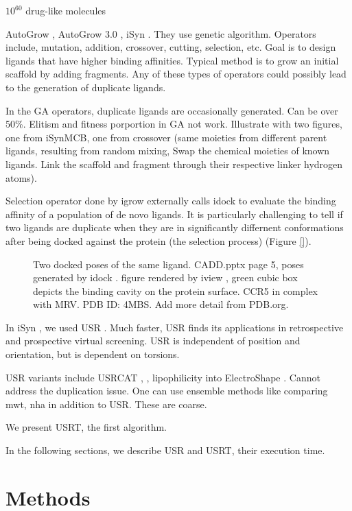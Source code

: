 \documentclass[twocolumn]{svjour3}          %
\begin{document}
$10^{60}$ drug-like molecules \cite{} %

AutoGrow \cite{466}, AutoGrow 3.0 \cite{1354}, iSyn \cite{}. They use genetic algorithm. Operators include, mutation, addition, crossover, cutting, selection, etc. Goal is to design ligands that have higher binding affinities. Typical method is to grow an initial scaffold by adding fragments. Any of these types of operators could possibly lead to the generation of duplicate ligands.

In the GA operators, duplicate ligands are occasionally generated. Can be over 50\%. Elitism and fitness porportion in GA not work. Illustrate with two figures, one from iSynMCB, one from crossover (same moieties from different parent ligands, resulting from random mixing, Swap the chemical moieties of known ligands. Link the scaffold and fragment through their respective linker hydrogen atoms).

Selection operator done by igrow externally calls idock to evaluate the binding affinity of a population of de novo ligands. It is particularly challenging to tell if two ligands are duplicate when they are in significantly differnent conformations after being docked against the protein (the selection process) (Figure \ref{}).

\begin{figure*}
\caption{Two docked poses of the same ligand. CADD.pptx page 5, poses generated by idock \cite{1153}. figure rendered by iview \cite{1366}, green cubic box depicts the binding cavity on the protein surface. CCR5 in complex with MRV. PDB ID: 4MBS. Add more detail from PDB.org.}
\label{fig:2}
\end{figure*}

In iSyn \cite{}, we used USR \cite{1379}. Much faster, USR finds its applications in retrospective \cite{1332} and prospective \cite{} virtual screening. USR is independent of position and orientation, but is dependent on torsions. %

USR variants include USRCAT \cite{1331}, \cite{1335}, lipophilicity into ElectroShape \cite{1338}. Cannot address the duplication issue. One can use ensemble methods like comparing mwt, nha in addition to USR. These are coarse.

We present USRT, the first algorithm.

In the following sections, we describe USR and USRT, their execution time.

\section{Methods}
\label{sec:methods}
\end{document}
